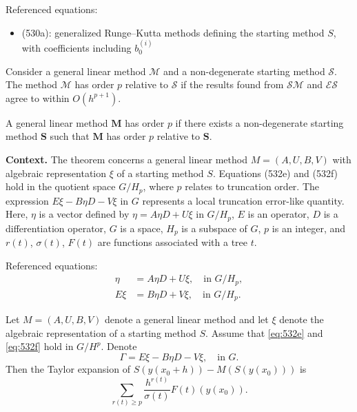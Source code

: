 Referenced equations:
\begin{itemize}
    \item (530a): generalized Runge--Kutta methods defining the starting method $S$, with coefficients including $b_{0}^{(i)}$
\end{itemize}

\begin{definition}

  \label{def:530B}
Consider a general linear method $\mathcal{M}$ and a non-degenerate starting method $\mathcal{S}$. The method $\mathcal{M}$ has order $p$ relative to $\mathcal{S}$ if the results found from $\mathcal{S}\mathcal{M}$ and $\mathcal{E}\mathcal{S}$ agree to within $O(h^{p+1})$.
\end{definition}

\begin{definition}

  \label{def:530C}
A general linear method $\mathbf{M}$ has order $p$ if there exists a non-degenerate starting method $\mathbf{S}$ such that $\mathbf{M}$ has order $p$ relative to $\mathbf{S}$.
\end{definition}

\noindent\textbf{Context.}
The theorem concerns a general linear method $M=(A,U,B,V)$ with algebraic representation $\xi$ of a starting method $S$. Equations (532e) and (532f) hold in the quotient space $G/H_{p}$, where $p$ relates to truncation order. The expression $E\xi - B\eta D - V\xi$ in $G$ represents a local truncation error-like quantity. Here, $\eta$ is a vector defined by $\eta = A\eta D + U\xi$ in $G/H_{p}$, $E$ is an operator, $D$ is a differentiation operator, $G$ is a space, $H_{p}$ is a subspace of $G$, $p$ is an integer, and $r(t)$, $\sigma(t)$, $F(t)$ are functions associated with a tree $t$.

Referenced equations:
\begin{align}
    \eta &= A\eta D + U\xi, \quad \text{in } G/H_{p}, \tag{532e}\\
    E\xi &= B\eta D + V\xi, \quad \text{in } G/H_{p}. \tag{532f}
\end{align}

\begin{theorem}

  \label{thm:532A}
Let $M = (A, U, B, V)$ denote a general linear method and let $\xi$ denote the algebraic representation of a starting method $S$. Assume that \eqref{eq:532e} and \eqref{eq:532f} hold in $G/H^p$. Denote
\[
\Gamma = E\xi - B\eta D - V\xi, \quad \text{in } G.
\]
Then the Taylor expansion of $S(y(x_0 + h)) - M(S(y(x_0)))$ is
\[
\sum_{r(t) \ge p} \frac{h^{r(t)}}{\sigma(t)} F(t)(y(x_0)). \tag{532g}
\]
\end{theorem}

